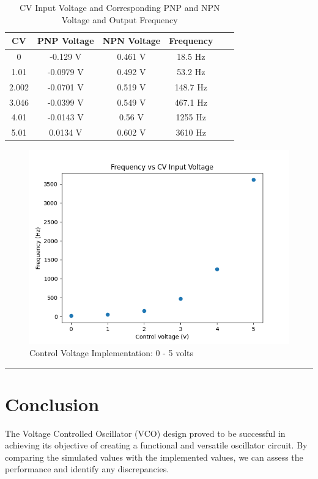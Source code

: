 \documentclass{article}
\begin{document}
\begin{table}[H]
  \centering
  \begin{tabular}{cccccc}
    \toprule
    \textbf{CV} & \textbf{PNP Voltage} & \textbf{NPN Voltage} & \textbf{Frequency} \\
    \midrule
    0 & -0.129 V & 0.461 V & 18.5 Hz \\
    1.01  & -0.0979 V & 0.492 V  & 53.2 Hz\\
    2.002 & -0.0701 V & 0.519 V  & 148.7 Hz\\
    3.046  & -0.0399 V & 0.549 V & 467.1 Hz\\
    4.01 & -0.0143 V & 0.56 V & 1255 Hz\\
    5.01 & 0.0134 V & 0.602 V & 3610 Hz\\
  \end{tabular}
  \caption{CV Input Voltage and Corresponding PNP and NPN Voltage and Output Frequency}
\end{table}

\begin{figure}[H]
  \centering
  \includegraphics[width=.7\linewidth]{png/Figure_6.png}
  \caption{Control Voltage Implementation: 0 - 5 volts}
\end{figure}

\vspace{5mm}
\hrule
  
\section*{\textcolor{mycolor}{Conclusion}}

The Voltage Controlled Oscillator (VCO) design proved to be successful in achieving its objective of creating a functional and versatile oscillator circuit. By comparing the simulated values with the implemented values, we can assess the performance and identify any discrepancies.
\end{document}

